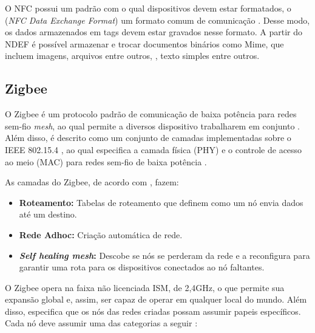 O NFC possui um padrão com o qual dispositivos devem estar formatados, o  (\textit{NFC Data Exchange Format}) um formato comum de comunicação \cite{Igoe2014}. Desse 
modo, os dados armazenados em tags devem estar gravados nesse formato. A partir do NDEF é possível armazenar e trocar documentos binários como Mime, que incluem imagens, arquivos  entre outros, 
, texto simples entre outros.


\subsection{Zigbee}

O Zigbee é um protocolo padrão de comunicação de baixa potência para redes sem-fio \textit{mesh}, ao qual permite a diversos dispositivo trabalharem em conjunto \cite{Faludi2011}. Além disso, é descrito como um conjunto de camadas implementadas sobre o IEEE 802.15.4 \cite{Faludi2011}, ao qual especifica a camada física (PHY) e o controle de acesso ao meio (MAC) para redes sem-fio de baixa potência \cite{IEEE2011}.

As camadas do Zigbee, de acordo com , fazem:

\begin{itemize} \parskip -4pt
	\item \textbf{Roteamento:} Tabelas de roteamento que definem como um nó envia dados até um 
	destino.
	\item \textbf{Rede Adhoc:} Criação automática de rede.
	\item \textbf{\textit{Self healing mesh}:} Descobe se nós se perderam da rede e a 
	reconfigura para garantir uma rota para os dispositivos conectados ao nó faltantes.
\end{itemize}

O Zigbee opera na faixa não licenciada ISM, de 2,4GHz, o que permite sua expansão global e, assim, ser capaz de operar em qualquer local do mundo. Além disso, especifica que os nós das redes criadas possam assumir papeis específicos. Cada nó deve assumir uma das categorias a seguir \cite{Faludi2011}:

